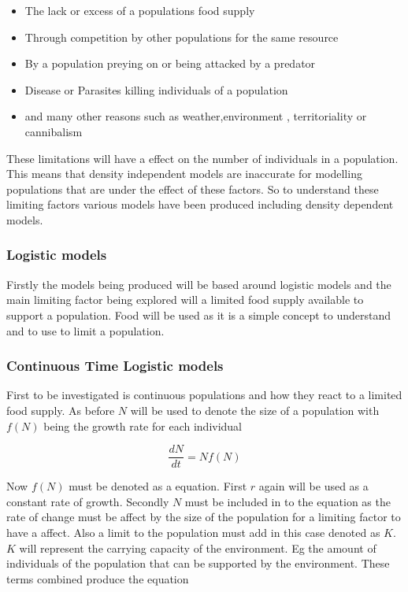 \documentclass[final]{cmpreport}
\begin{document}
		\begin{itemize}
			\item The lack or excess of a populations food supply 
			\item Through competition by other populations for the same resource
			\item By a population preying on or being attacked by a predator
			\item Disease or Parasites killing individuals of a population
			\item and many other reasons such as weather,environment , territoriality or cannibalism
		\end{itemize}
	
	These limitations will have a effect on the number of individuals in a population. This means that density independent models are inaccurate for modelling populations that are under the effect of these factors. So to understand these limiting factors various models have been produced including density dependent models.
	
	
		
	\subsubsection{Logistic models}
	Firstly the models being produced will be based around logistic models and the main limiting factor being explored will a limited food supply available to support a population. Food will be used as it is a simple concept to understand and to use to limit a population.
	
	\subsubsection{Continuous Time Logistic models}
	First to be investigated is continuous populations and how they react to a limited food supply. As before $N$ will be used to denote the size of a population with $f(N)$ being the growth rate for each individual
	
	\begin{equation}
	\frac{dN}{dt} = Nf(N) 
	\end{equation}
	
	Now $f(N)$ must be denoted as a equation. First $r$ again will be used as a constant rate of growth. Secondly $N$ must be included in to the equation as the rate of change must be affect by the size of the population for a limiting factor to have a affect. Also a limit to the population must add in this case denoted as $K$. $K$ will represent the carrying capacity of the environment. Eg the amount of individuals of the population that can be supported by the environment. These terms combined produce the equation
	
\end{document}
